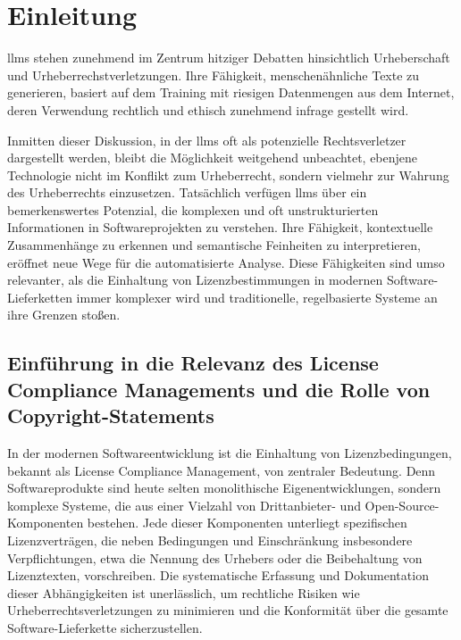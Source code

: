 \chapter{Einleitung}\label{ch:einleitung}

\glspl{llm} stehen zunehmend im Zentrum hitziger Debatten hinsichtlich Urheberschaft und Urheberrechstverletzungen.
Ihre Fähigkeit, menschenähnliche Texte zu generieren, basiert auf dem Training mit riesigen Datenmengen aus dem Internet, deren Verwendung rechtlich und ethisch zunehmend infrage gestellt wird.

Inmitten dieser Diskussion, in der \glspl{llm} oft als potenzielle Rechtsverletzer dargestellt werden, bleibt die Möglichkeit weitgehend unbeachtet, ebenjene Technologie nicht im Konflikt zum Urheberrecht, sondern vielmehr zur Wahrung des Urheberrechts einzusetzen.
Tatsächlich verfügen \glspl{llm} über ein bemerkenswertes Potenzial, die komplexen und oft unstrukturierten Informationen in Softwareprojekten zu verstehen.
Ihre Fähigkeit, kontextuelle Zusammenhänge zu erkennen und semantische Feinheiten zu interpretieren, eröffnet neue Wege für die automatisierte Analyse.
Diese Fähigkeiten sind umso relevanter, als die Einhaltung von Lizenzbestimmungen in modernen Software-Lieferketten immer komplexer wird und traditionelle, regelbasierte Systeme an ihre Grenzen stoßen.


\section{Einführung in die Relevanz des License Compliance Managements und die Rolle von Copyright-Statements}\label{sec:einfuhrung}

In der modernen Softwareentwicklung ist die Einhaltung von Lizenzbedingungen, bekannt als License Compliance Management, von zentraler Bedeutung.
Denn Softwareprodukte sind heute selten monolithische Eigenentwicklungen, sondern komplexe Systeme, die aus einer Vielzahl von Drittanbieter- und Open-Source-Komponenten bestehen.
Jede dieser Komponenten unterliegt spezifischen Lizenzverträgen, die neben Bedingungen und Einschränkung insbesondere Verpflichtungen, etwa die Nennung des Urhebers oder die Beibehaltung von Lizenztexten, vorschreiben.
Die systematische Erfassung und Dokumentation dieser Abhängigkeiten ist unerlässlich, um rechtliche Risiken wie Urheberrechtsverletzungen zu minimieren und die Konformität über die gesamte Software-Lieferkette sicherzustellen.

